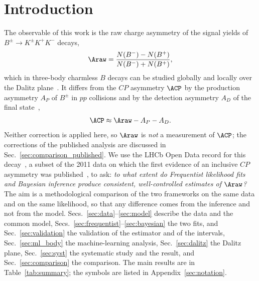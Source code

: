 \section{Introduction}
\label{sec:intro}
The observable of this work is the raw charge asymmetry of the signal yields of $B^{\pm}\to K^{\pm}K^{+}K^{-}$ decays,
\begin{equation}
\Araw=\frac{N(B^-)-N(B^+)}{N(B^-)+N(B^+)} ,
\label{eq:araw}
\end{equation}
which in three-body charmless $B$ decays can be studied globally and locally over the Dalitz plane~\cite{lhcb_cpv_prd2023,lhcb_cpv_paper}. It differs from the $CP$ asymmetry $\ACP$ by the production asymmetry $A_P$ of $B^\pm$ in $pp$ collisions and by the detection asymmetry $A_D$ of the final state~\cite{lhcb_cpv_prd2023},
\begin{equation}
\ACP\approx\Araw-A_P-A_D .
\label{eq:acp}
\end{equation}
Neither correction is applied here, so $\Araw$ is \emph{not} a measurement of $\ACP$; the corrections of the published analysis are discussed in Sec.~\ref{sec:comparison_published}.
We use the LHCb Open Data record for this decay~\cite{opendata_record,opendata_notebook}, a subset of the 2011 data on which the first evidence of an inclusive $CP$ asymmetry was published~\cite{lhcb_cpv_2013}, to ask: \emph{to what extent do Frequentist likelihood fits and Bayesian inference produce consistent, well-controlled estimates of $\Araw$?} The aim is a methodological comparison of the two frameworks on the same data and on the same likelihood, so that any difference comes from the inference and not from the model. Secs.~\ref{sec:data}--\ref{sec:model} describe the data and the common model, Secs.~\ref{sec:frequentist}--\ref{sec:bayesian} the two fits, and Sec.~\ref{sec:validation} the validation of the estimator and of the intervals, Sec.~\ref{sec:ml_body} the machine-learning analysis, Sec.~\ref{sec:dalitz} the Dalitz plane, Sec.~\ref{sec:syst} the systematic study and the result, and Sec.~\ref{sec:comparison} the comparison. The main results are in Table~\ref{tab:summary}; the symbols are listed in Appendix~\ref{sec:notation}.

